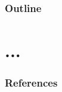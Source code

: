 



\begin{frame}[plain]
\titlepage
\end{frame}



\begin{frame}
\frametitle{Outline}
\tableofcontents
\end{frame}

\section[...]{...}

\begin{frame}[allowframebreaks]
\frametitle{References}
\fontsize{5pt}{5pt}\selectfont
\def\newblock{\hskip .11em plus .33em minus .07em}


\normalsize
\end{frame}

